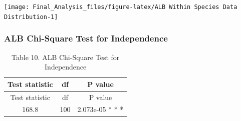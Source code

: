 \begin{center}\texttt{[image: Final\_Analysis\_files/figure-latex/ALB Within Species Data Distribution-1]} \end{center}

\subsubsection{ALB Chi-Square Test for
Independence}\label{alb-chi-square-test-for-independence}

\begin{Shaded}
\begin{Highlighting}[]
\NormalTok{(} \NormalTok{, } \NormalTok{)}
\end{Highlighting}
\end{Shaded}

\begin{longtable}[]{@{}ccc@{}}
\caption{Table 10. ALB Chi-Square Test for Independence}\tabularnewline
\toprule
\begin{minipage}[b]{0.22\columnwidth}\centering\strut
Test statistic\strut
\end{minipage} & \begin{minipage}[b]{0.08\columnwidth}\centering\strut
df\strut
\end{minipage} & \begin{minipage}[b]{0.22\columnwidth}\centering\strut
P value\strut
\end{minipage}\tabularnewline
\midrule
\endfirsthead
\toprule
\begin{minipage}[b]{0.22\columnwidth}\centering\strut
Test statistic\strut
\end{minipage} & \begin{minipage}[b]{0.08\columnwidth}\centering\strut
df\strut
\end{minipage} & \begin{minipage}[b]{0.22\columnwidth}\centering\strut
P value\strut
\end{minipage}\tabularnewline
\midrule
\endhead
\begin{minipage}[t]{0.22\columnwidth}\centering\strut
168.8\strut
\end{minipage} & \begin{minipage}[t]{0.08\columnwidth}\centering\strut
100\strut
\end{minipage} & \begin{minipage}[t]{0.22\columnwidth}\centering\strut
2.073e-05 * * *\strut
\end{minipage}\tabularnewline
\bottomrule
\end{longtable}

